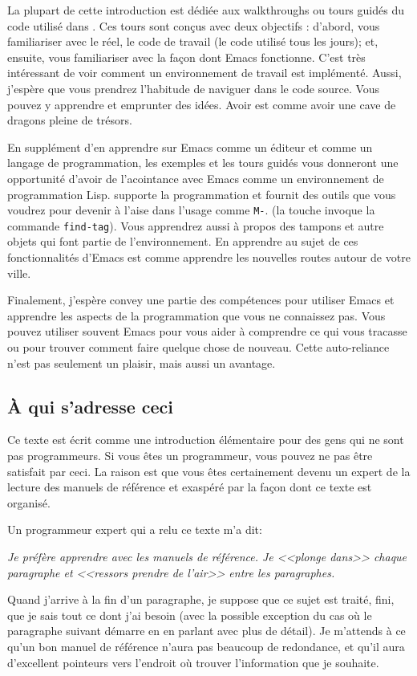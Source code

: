 La plupart de cette introduction est dédiée aux walkthroughs ou tours
guidés du code utilisé dans \gnue . Ces tours sont conçus avec deux
objectifs : d'abord, vous familiariser avec le réel, le code de
travail (le code utilisé tous les jours); et, ensuite, vous
familiariser avec la façon dont Emacs fonctionne. C'est très
intéressant de voir comment un environnement de travail est
implémenté. Aussi, j'espère que vous prendrez l'habitude de naviguer
dans le code source. Vous pouvez y apprendre et emprunter des
idées. Avoir \gnue est comme avoir une cave de dragons pleine de
trésors.

En supplément d'en apprendre sur Emacs comme un éditeur et \el comme
un langage de programmation, les exemples et les tours guidés vous
donneront une opportunité d'avoir de l'acointance avec Emacs comme un
environnement de programmation Lisp. \gnue supporte la programmation et
fournit des outils que vous voudrez pour devenir à l'aise dans l'usage
comme \texttt{M-}. (la touche invoque la commande
\texttt{find-tag}). Vous apprendrez aussi à propos des tampons et
autre objets qui font partie de l'environnement. En apprendre au sujet
de ces fonctionnalités d'Emacs est comme apprendre les nouvelles
routes autour de votre ville.

Finalement, j'espère convey une partie des compétences pour utiliser
Emacs et apprendre les aspects de la programmation que vous ne
connaissez pas. Vous pouvez utiliser souvent Emacs pour vous aider à
comprendre ce qui vous tracasse ou pour trouver comment faire quelque
chose de nouveau. Cette auto-reliance n'est pas seulement un plaisir,
mais aussi un avantage.

\subsection*{\`A qui s'adresse ceci}

Ce texte est écrit comme une introduction élémentaire pour des gens
qui ne sont pas programmeurs. Si vous êtes un programmeur, vous pouvez
ne pas être satisfait par ceci. La raison est que vous êtes
certainement devenu un expert de la lecture des manuels de référence
et exaspéré par la façon dont ce texte est organisé.

Un programmeur expert qui a relu ce texte m'a dit:

{\it Je préfère apprendre avec les manuels de référence. Je <<plonge
dans>> chaque paragraphe et <<ressors prendre de l'air>> entre les
paragraphes.

Quand j'arrive à la fin d'un paragraphe, je suppose que ce sujet est
traité, fini, que je sais tout ce dont j'ai besoin (avec la possible
exception du cas où le paragraphe suivant démarre en en parlant avec
plus de détail). Je m'attends à ce qu'un bon manuel de référence
n'aura pas beaucoup de redondance, et qu'il aura d'excellent pointeurs
vers l'endroit où trouver l'information que je souhaite.
}

